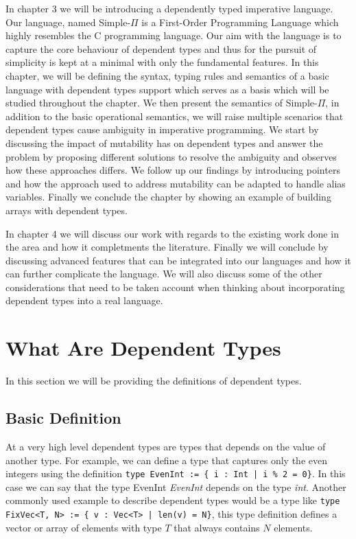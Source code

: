 \documentclass[a4paper,12pt]{report}
\begin{document}
\par
In chapter 3 we will be introducing a dependently typed imperative language. 
Our language, named Simple-$\Pi$ is a First-Order Programming Language which 
highly resembles the C programming language. Our aim with the language is to 
capture the core behaviour of dependent types and thus for the pursuit 
of simplicity is kept at a minimal with 
only the fundamental features. In this chapter, we will be 
defining the syntax, typing rules and semantics 
of a basic language with dependent types support which serves as a basis 
which will be studied throughout the chapter. 
We then present the semantics of Simple-$\Pi$, in addition 
to the basic operational semantics, we will raise
multiple scenarios that dependent types cause ambiguity in imperative programming. 
We start by discussing the impact of mutability has on dependent types and 
answer the problem by proposing different solutions to resolve the 
ambiguity and observes how these approaches differs. 
We follow up our findings by introducing pointers and how the approach used to 
address mutability can be adapted to handle alias variables. Finally we conclude 
the chapter by showing an example of building arrays with dependent types. 

\par
In chapter 4 we will discuss our work with regards to the 
existing work done in the area and how it completments the literature.
Finally we will conclude by discussing advanced features that can be integrated 
into our languages and how it can further complicate the language. We will also 
discuss some of the other considerations that need to be taken account when 
thinking about incorporating dependent types into a real language. 

\section{What Are Dependent Types}
In this section we will be providing the definitions of dependent types.

\subsection{Basic Definition}
At a very high level dependent types are types that depends on the value of 
another type. For example, we can define a type that captures only the even 
integers using the definition 
\verb+type EvenInt := { i : Int | i % 2 = 0}+. In this case we 
can say that the type EvenInt \textit{EvenInt} depends on the type \textit{int}.
Another commonly used example to describe dependent types would be a type like 
\verb+type FixVec<T, N> := { v : Vec<T> | len(v) = N}+, this type definition defines 
a vector or array of elements with type $T$ that always contains $N$ elements.
\end{document}
